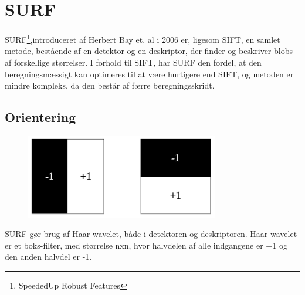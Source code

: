\section{SURF}
SURF\footnote{SpeededUp Robust Features},introduceret af Herbert Bay et. al \cite{SURF} i 2006 er, ligesom SIFT, en samlet metode, bestående af en detektor og en deskriptor, der finder og beskriver blobs af forskellige størrelser. I forhold til SIFT, har SURF den fordel, at den beregningsmæssigt kan optimeres til at være hurtigere end SIFT, og metoden er mindre kompleks, da den består af færre beregningsskridt.

\subsection{Orientering}
\begin{figure}[H]
    \centering
    \includegraphics[width=0.75\textwidth]{fig/haarwavelet.png}
     \vspace{-1em}
    \begin{center}    
       \caption{\textcolor{gray}{\footnotesize \textit{ }}}
    \label{fig:haarwavelet}
     \end{center}
     \vspace{-2.5em}
  \end{figure} \noindent

SURF gør brug af Haar-wavelet, både i detektoren og deskriptoren. Haar-wavelet er et boks-filter, med størrelse nxn, hvor halvdelen af alle indgangene er +1 og den anden halvdel er -1.


